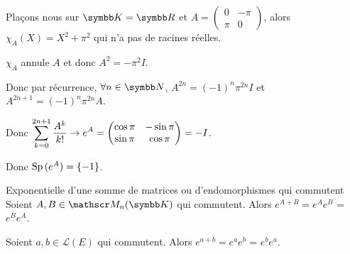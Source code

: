 
\begin{exemple}
    Plaçons nous sur $\K = \R$ et $A = \begin{pmatrix}
    0 & -\pi \\
    \pi & 0
    \end{pmatrix}$, alors $\chi_A(X) = X^2 + \pi^2$ qui n'a pas de racines réelles. 

    $\chi_A$ annule $A$ et donc $A^2 = -\pi^2 I$. 

    Donc par récurrence, $\forall n \in \N$, $A^{2n} = (-1)^n \pi^{2n} I$ et $A^{2n + 1} = (-1)^n \pi^{2n} A$.

    Donc $\displaystyle \sum_{k = 0}^{2n + 1} \frac{A^k}{k!} \to e^A = \begin{pmatrix}
    \cos \pi & -\sin \pi \\
    \sin \pi & \cos \pi
    \end{pmatrix} = -I$.

    Donc $\operatorname{Sp} \,(e^A) = \{-1\}$. 
\end{exemple}


\begin{theorement}{Exponentielle d'une somme de matrices ou d'endomorphismes qui commutent}{}
    Soient $A, B \in \mathscr M_n(\K)$ qui commutent. Alors $e^{A + B} = e^A e^B$ = $e^B e^A$.
    
    Soient $a, b \in \mathscr L(E)$ qui commutent. Alors $e^{a + b} = e^a e^b$ = $e^b e^a$.
\end{theorement}



